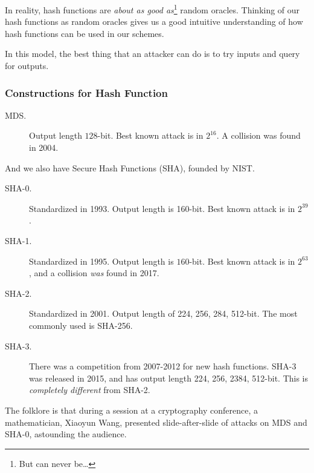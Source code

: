 In reality, hash functions are \emph{about as good as}\footnote{But can never be\dots} random oracles. Thinking of our hash functions as random oracles gives us a good intuitive understanding of how hash functions can be used in our schemes.

In this model, the best thing that an attacker can do is to try inputs and query for outputs.

\subsubsection{Constructions for Hash Function}
\begin{description}
    \item[MDS.] Output length $128$-bit. Best known attack is in $2^{16}$. A collision was found in 2004.
\end{description}
And we also have Secure Hash Functions (SHA), founded by NIST.
\begin{description}
    \item[SHA-0.] Standardized in 1993. Output length is 160-bit. Best known attack is in $2^{39}$.
    \item[SHA-1.] Standardized in 1995. Output length is $160$-bit. Best known attack is in $2^{63}$, and a collision \emph{was} found in 2017.
    \item[SHA-2.] Standardized in 2001. Output length of 224, 256, 284, 512-bit. The most commonly used is SHA-256.
    \item[SHA-3.] There was a competition from 2007-2012 for new hash functions. SHA-3 was released in 2015, and has output length 224, 256, 2384, 512-bit. This is \emph{completely different} from SHA-2.
\end{description}

\begin{remark*}
    The folklore is that during a session at a cryptography conference, a mathematician, Xiaoyun Wang, presented slide-after-slide of attacks on MDS and SHA-0, astounding the audience.
\end{remark*}